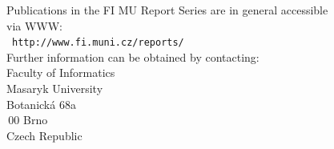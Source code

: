 {{\noindent
\begin{tabbing}
Publications in the FI MU Report Series are in general accessible \\via
WWW: \\[1ex]
\hspace{\odsaz}\ \= {\tt http://www.fi.muni.cz/reports/}\\[4ex]
%
Further information can be obtained by contacting: \\[1ex]
\> Faculty of Informatics\\
\> Masaryk University\\
\> Botanická 68a\\
\,00 Brno\\
\> Czech Republic
\end{tabbing}
}}

